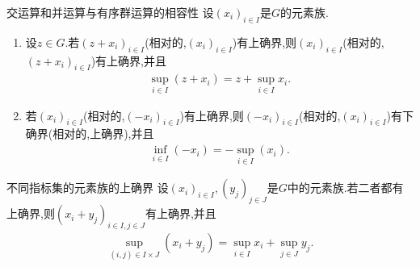 \begin{proposition}{交运算和并运算与有序群运算的相容性}{}
	设$\left(x_{i}\right)_{i\in I}$是$G$的元素族.
	\begin{enumerate}
		\item 设$z\in G$.若$\left(z+x_{i}\right)_{i\in I}$(相对的,$\left(x_{i}\right)_{i\in I}$)有上确界,则$\left(x_{i}\right)_{i\in I}$(相对的,$\left(z+x_{i}\right)_{i\in I}$)有上确界,并且
		\begin{align*}
			\sup\limits_{i\in I}\left(z+x_{i}\right)=z+\sup\limits_{i\in I}x_{i}.
		\end{align*}
		\item 若$\left(x_{i}\right)_{i\in I}$(相对的,$\left(-x_{i}\right)_{i\in I}$)有上确界,则$\left(-x_{i}\right)_{i\in I}$(相对的,$\left(x_{i}\right)_{i\in I}$)有下确界(相对的,上确界),并且
		\begin{align*}
			\inf\limits_{i\in I}\left(-x_{i}\right)=-\sup\limits_{i\in I}\left(x_{i}\right).
		\end{align*}
	\end{enumerate}
\end{proposition}

\begin{proposition}{不同指标集的元素族的上确界}{}
	设$\left(x_{i}\right)_{i\in I},\left(y_{j}\right)_{j\in J}$是$G$中的元素族.若二者都有上确界,则$\left(x_{i}+y_{j}\right)_{i\in I,j\in J}$有上确界,并且
	\begin{align*}
		\sup\limits_{\left(i,j\right)\in I\times J}\left(x_{i}+y_{j}\right)=\sup\limits_{i\in I}x_{i}+\sup\limits_{j\in J}y_{j}.
	\end{align*}
\end{proposition}













